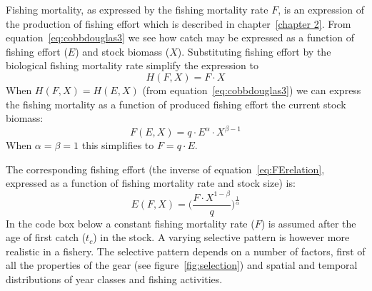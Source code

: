 \documentclass[11pt,fleqn]{book} %
\begin{document}
Fishing mortality, as expressed by the fishing mortality rate $F$, is an expression of the production of fishing effort which is described in chapter~\ref{chapter 2}. From equation~\ref{eq:cobbdouglas3} we see how catch may be expressed as a function of fishing effort ($E$) and stock biomass ($X$). Substituting fishing effort by the biological fishing mortality rate simplify the expression to
\begin{equation} 
\label{eq:production2}
H(F,X) = F \cdot X
\end{equation}
When $H(F,X) = H(E,X)$ (from equation~\ref{eq:cobbdouglas3}) we can express the fishing mortality as a function of produced fishing effort the current stock biomass:
\begin{equation} 
\label{eq:FErelation}
F(E,X) = q \cdot E^{\alpha} \cdot X^{\beta-1}
\end{equation}
When $\alpha = \beta = 1$ this simplifies to $F = q \cdot E$.

The corresponding fishing effort (the inverse of equation~\ref{eq:FErelation}, expressed as a function of fishing mortality rate and stock size) is: 
\begin{equation} 
\label{eq:EFrelation}
E(F,X) =\bigg(\frac{F \cdot X^{1-\beta}}{q}\bigg)^{\frac{1}{\alpha}}
\end{equation}
In the code box below a constant fishing mortality rate ($F$) is assumed after the age of first catch ($t_c$) in the stock. A varying selective pattern is however more realistic in a fishery. The selective pattern depends on a number of factors, first of all the properties of the gear (see figure~\ref{fig:selection}) and spatial and temporal distributions of year classes and fishing activities.
\end{document}
